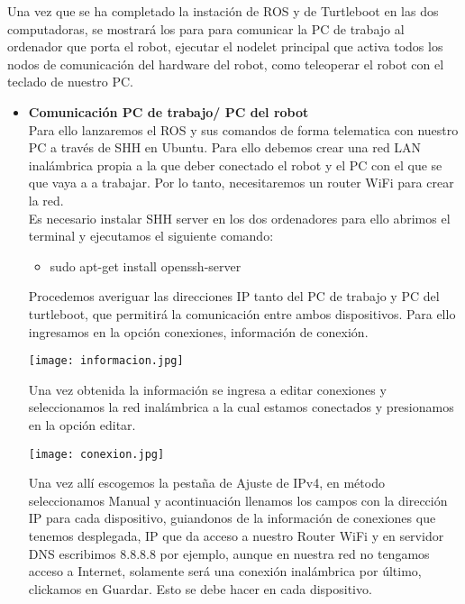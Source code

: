 \documentclass[12pt,a4paper]{article}
\begin{document}
Una vez que se ha completado la instación de ROS y de Turtleboot en las dos computadoras, se mostrará los para para comunicar la PC de trabajo al ordenador que porta el robot, ejecutar el nodelet principal que activa todos los nodos de comunicación del hardware del robot, como teleoperar el robot con el teclado de nuestro PC.

\begin{itemize}
\item \textbf{Comunicación PC de trabajo/ PC del robot}\\
Para ello lanzaremos el ROS y sus comandos de forma telematica con nuestro PC a través de
SHH en Ubuntu. Para ello debemos crear una red LAN inalámbrica propia a la que deber 
conectado el robot y el PC con el que se que vaya a a trabajar. Por lo tanto, necesitaremos un
router WiFi para crear la red.\\
Es necesario instalar SHH server en los dos ordenadores para ello abrimos el terminal y ejecutamos el siguiente comando:
\begin{itemize}
\item sudo apt-get install openssh-server
\end{itemize}
Procedemos averiguar las direcciones IP tanto del PC de trabajo y PC del turtleboot, que permitirá la comunicación entre ambos dispositivos. Para ello ingresamos en la opción conexiones, información de conexión.

\begin{center}
\texttt{[image: informacion.jpg]}
\end{center}

Una vez obtenida la información se ingresa a editar conexiones y seleccionamos la red inalámbrica a la cual estamos conectados y presionamos en la opción editar.

\begin{center}
\texttt{[image: conexion.jpg]}
\end{center}

Una vez allí escogemos la pestaña de Ajuste de IPv4, en método seleccionamos Manual y acontinuación llenamos los campos con la dirección IP para cada dispositivo, guiandonos de la información de conexiones que tenemos desplegada, IP que da acceso a nuestro Router WiFi y en servidor DNS escribimos 8.8.8.8 por ejemplo, aunque en nuestra red no tengamos acceso a Internet, solamente será una conexión inalámbrica por último, clickamos en Guardar. Esto se debe hacer en cada dispositivo.


\end{itemize}
\end{document}
